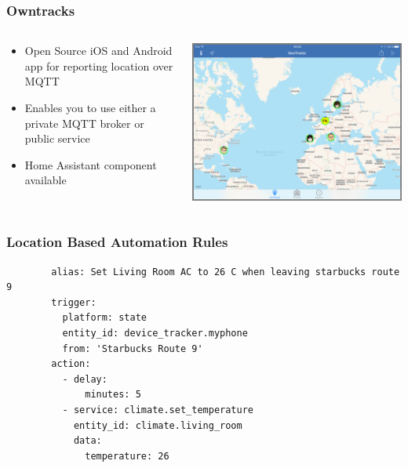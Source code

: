 \documentclass[aspectratio=169,11pt,hyperref={colorlinks=true}]{beamer}
\begin{document}
\begin{frame}
    \frametitle{Owntracks}
    \begin{columns}[T]
        \begin{column}{.48\textwidth}
            \begin{itemize}
                \item Open Source iOS and Android app for reporting location over MQTT
                \item Enables you to use either a private MQTT broker or public service
                \item Home Assistant component available
            \end{itemize}
        \end{column}
        \begin{column}{.48\textwidth}
            \centering
            \includegraphics[width=.8\textwidth]{ipad-public-map.png}
        \end{column}
    \end{columns}
\end{frame}

\begin{frame}[fragile=singleslide]
    \frametitle{Location Based Automation Rules}
    \begin{verbatim}
        alias: Set Living Room AC to 26 C when leaving starbucks route 9
        trigger:
          platform: state
          entity_id: device_tracker.myphone
          from: 'Starbucks Route 9'
        action:
          - delay:
              minutes: 5
          - service: climate.set_temperature
            entity_id: climate.living_room
            data:
              temperature: 26
    \end{verbatim}
\end{frame}
\end{document}
